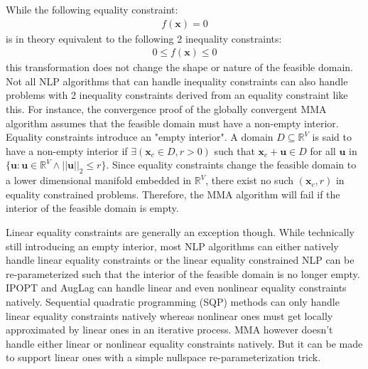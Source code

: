 While the following equality constraint:
\begin{align}
  f(\bm{x}) = 0
\end{align}
is in theory equivalent to the following 2 inequality constraints:
\begin{align}
  0 \leq f(\bm{x}) \leq 0
\end{align}
this transformation does not change the shape or nature of the feasible domain. Not all NLP algorithms that can handle inequality constraints can also handle problems with 2 inequality constraints derived from an equality constraint like this. For instance, the convergence proof of the globally convergent MMA algorithm \citep{Svanberg2002} assumes that the feasible domain must have a non-empty interior. Equality constraints introduce an "empty interior". A domain $D \subseteq \mathbb{R}^V$ is said to have a non-empty interior if $\exists (\bm{x}_c \in D, r > 0)$ such that $\bm{x}_c + \bm{u} \in D$ for all $\bm{u}$ in $\{\bm{u} : \bm{u} \in \mathbb{R}^V \wedge ||\bm{u}||_2 \leq r\}$. Since equality constraints change the feasible domain to a lower dimensional manifold embedded in $\mathbb{R}^V$, there exist no such $(\bm{x}_c, r)$ in equality constrained problems. Therefore, the MMA algorithm will fail if the interior of the feasible domain is empty.

Linear equality constraints are generally an exception though. While technically still introducing an empty interior, most NLP algorithms can either natively handle linear equality constraints or the linear equality constrained NLP can be re-parameterized such that the interior of the feasible domain is no longer empty. IPOPT and AugLag can handle linear and even nonlinear equality constraints natively. Sequential quadratic programming (SQP) methods \citep{Boyd2009} can only handle linear equality constraints natively whereas nonlinear ones must get locally approximated by linear ones in an iterative process. MMA however doesn't handle either linear or nonlinear equality constraints natively. But it can be made to support linear ones with a simple nullspace re-parameterization trick.

